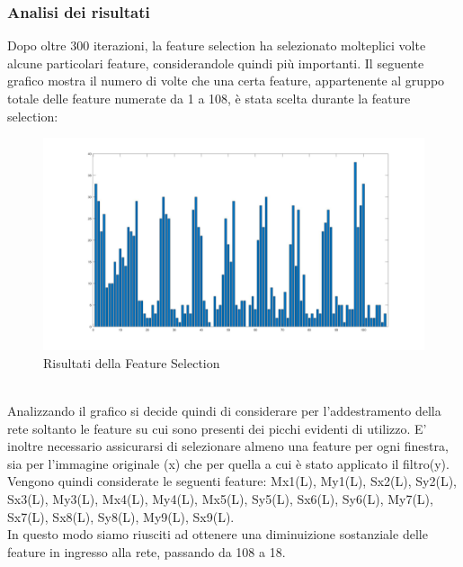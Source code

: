\documentclass[a4paper,11pt]{article}
\begin{document}
    \subsubsection{Analisi dei risultati}
    Dopo oltre 300 iterazioni, la feature selection ha selezionato molteplici volte alcune particolari feature, considerandole quindi più importanti.
    Il seguente grafico mostra il numero di volte che una certa feature, appartenente al gruppo totale delle feature numerate da 1 a 108, è stata scelta durante la feature selection: 
    \begin{figure}[h]
        \centering
        \includegraphics[scale=0.18]{featureselection}
        \caption{Risultati della Feature Selection}
    \end{figure}
    \\Analizzando il grafico si decide quindi di considerare per l'addestramento della rete soltanto le feature su cui sono presenti dei picchi evidenti di utilizzo. E' inoltre necessario assicurarsi di selezionare
    almeno una feature per ogni finestra, sia per l'immagine originale (x) che per quella a cui è stato applicato il filtro(y). Vengono quindi considerate le seguenti feature:
    Mx1(L), My1(L), Sx2(L), Sy2(L), Sx3(L), My3(L), Mx4(L), My4(L), Mx5(L), Sy5(L), Sx6(L), Sy6(L), My7(L), Sx7(L), Sx8(L), Sy8(L), My9(L), Sx9(L).\\
    In questo modo siamo riusciti ad ottenere una diminuizione sostanziale delle feature in ingresso alla rete, passando da 108 a 18.
    \newpage
\end{document}
